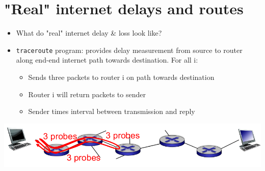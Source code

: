 \documentclass{article}[18pt]
\begin{document}
\section{"Real" internet delays and routes}
\begin{itemize}
	\item What do "real" internet delay \& loss look like?
	\item \texttt{traceroute} program: provides delay measurement from source to router along end-end internet path towards destination. For all i:
	\begin{itemize}
		\item Sends three packets to router i on path towards destination
		\item Router i will return packets to sender
		\item Sender times interval between transmission and reply
	\end{itemize}
\end{itemize}
\begin{center}
	\includegraphics[scale=0.7]{delay_and_routes}
\end{center}
\end{document}
